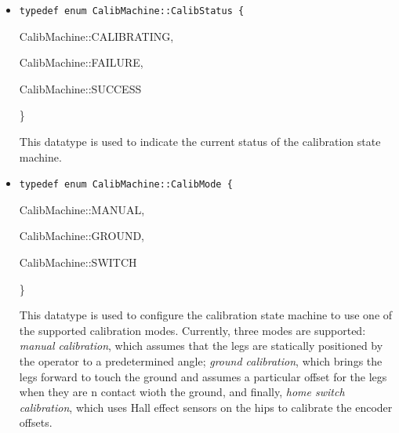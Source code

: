 \datatypes

\begin{itemize}
\item{\tt typedef enum CalibMachine::CalibStatus \{ \par
CalibMachine::CALIBRATING, \par
CalibMachine::FAILURE, \par
CalibMachine::SUCCESS  \par \}}\par

This datatype is used to indicate the current status of the calibration
state machine.

\item{\tt typedef enum CalibMachine::CalibMode \{ \par
CalibMachine::MANUAL, \par
CalibMachine::GROUND, \par
CalibMachine::SWITCH \par \} }\par

This datatype is used to configure the calibration state machine to use one
of the supported calibration modes. Currently, three modes are supported:
{\em manual calibration}, which assumes that the legs are statically
positioned by the operator to a predetermined angle; {\em ground
  calibration}, which brings the legs forward to touch the ground and
assumes a particular offset for the legs when they are n contact wioth the
ground, and finally, {\em home switch calibration}, which uses Hall effect
sensors on the hips to calibrate the encoder offsets.
\end{itemize}

\configsymbols

